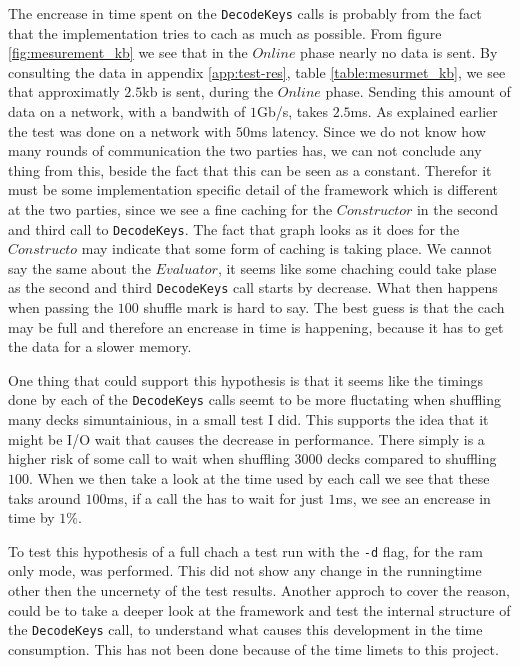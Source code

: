 \documentclass[twoside,11pt,openright]{report}
\begin{document}
The encrease in time spent on the \verb|DecodeKeys| calls is probably from the fact that the implementation tries to cach as much as possible. From figure \ref{fig:mesurement_kb} we see that in the $Online$ phase nearly no data is sent. By consulting the data in appendix \ref{app:test-res}, table \ref{table:mesurmet_kb}, we see that approximatly $2.5$kb is sent, during the $Online$ phase. Sending this amount of data on a network, with a bandwith of $1$Gb/s, takes $2.5$ms. As explained earlier the test was done on a network with $50$ms latency. Since we do not know how many rounds of communication the two parties has, we can not conclude any thing from this, beside the fact that this can be seen as a constant. Therefor it must be some implementation specific detail of the framework which is different at the two parties, since we see a fine caching for the $Constructor$ in the second and third call to \verb|DecodeKeys|. The fact that graph looks as it does for the $Constructo$ may indicate that some form of caching is taking place. We cannot say the same about the $Evaluator$, it seems like some chaching could take plase as the second and third \verb|DecodeKeys| call starts by decrease. What then happens when passing the $100$ shuffle mark is hard to say. The best guess is that the cach may be full and therefore an encrease in time is happening, because it has to get the data for a slower memory.

One thing that could support this hypothesis is that it seems like the timings done by each of the \verb|DecodeKeys| calls seemt to be more fluctating when shuffling many decks simuntainious, in a small test I did. This supports the idea that it might be I/O wait that causes the decrease in performance. There simply is a higher risk of some call to wait when shuffling $3000$ decks compared to shuffling $100$. When we then take a look at the time used by each call we see that these taks around $100$ms, if a call the has to wait for just $1$ms, we see an encrease in time by $1\%$.

To test this hypothesis of a full chach a test run with the \verb|-d| flag, for the ram only mode, was performed. This did not show any change in the runningtime other then the uncernety of the test results. Another approch to cover the reason, could be to take a deeper look at the framework and test the internal structure of the \verb|DecodeKeys| call, to understand what causes this development in the time consumption. This has not been done because of the time limets to this project.
\end{document}
